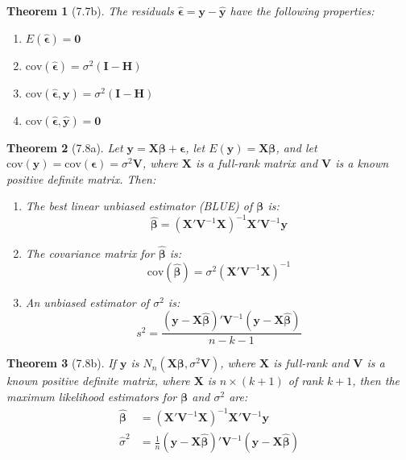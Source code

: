 \documentclass{article}
\newtheorem{theorem}{Theorem}[section]
\begin{document}
\begin{theorem}[7.7b]
The residuals $\hat{\boldsymbol{\epsilon}} = \mathbf{y} - \hat{\mathbf{y}}$ have the following properties:
\begin{enumerate}[label=(\roman*)]
\item $E(\hat{\boldsymbol{\epsilon}}) = \mathbf{0}$
\item $\text{cov}(\hat{\boldsymbol{\epsilon}}) = \sigma^2(\mathbf{I} - \mathbf{H})$
\item $\text{cov}(\hat{\boldsymbol{\epsilon}}, \mathbf{y}) = \sigma^2(\mathbf{I} - \mathbf{H})$
\item $\text{cov}(\hat{\boldsymbol{\epsilon}}, \hat{\mathbf{y}}) = \mathbf{0}$
\end{enumerate}
\end{theorem}

\begin{theorem}[7.8a]
Let $\mathbf{y} = \mathbf{X}\boldsymbol{\beta} + \boldsymbol{\epsilon}$, let $E(\mathbf{y}) = \mathbf{X}\boldsymbol{\beta}$, and let $\text{cov}(\mathbf{y}) = \text{cov}(\boldsymbol{\epsilon}) = \sigma^2\mathbf{V}$, where $\mathbf{X}$ is a full-rank matrix and $\mathbf{V}$ is a known positive definite matrix. Then:
\begin{enumerate}[label=(\roman*)]
\item The best linear unbiased estimator (BLUE) of $\boldsymbol{\beta}$ is:
\[\hat{\boldsymbol{\beta}} = (\mathbf{X}'\mathbf{V}^{-1}\mathbf{X})^{-1}\mathbf{X}'\mathbf{V}^{-1}\mathbf{y}\]
\item The covariance matrix for $\hat{\boldsymbol{\beta}}$ is:
\[\text{cov}(\hat{\boldsymbol{\beta}}) = \sigma^2(\mathbf{X}'\mathbf{V}^{-1}\mathbf{X})^{-1}\]
\item An unbiased estimator of $\sigma^2$ is:
\[s^2 = \frac{(\mathbf{y} - \mathbf{X}\hat{\boldsymbol{\beta}})'\mathbf{V}^{-1}(\mathbf{y} - \mathbf{X}\hat{\boldsymbol{\beta}})}{n-k-1}\]
\end{enumerate}
\end{theorem}

\begin{theorem}[7.8b]
If $\mathbf{y}$ is $N_n(\mathbf{X}\boldsymbol{\beta}, \sigma^2\mathbf{V})$, where $\mathbf{X}$ is full-rank and $\mathbf{V}$ is a known positive definite matrix, where $\mathbf{X}$ is $n \times (k+1)$ of rank $k+1$, then the maximum likelihood estimators for $\boldsymbol{\beta}$ and $\sigma^2$ are:
\begin{align*}
\hat{\boldsymbol{\beta}} &= (\mathbf{X}'\mathbf{V}^{-1}\mathbf{X})^{-1}\mathbf{X}'\mathbf{V}^{-1}\mathbf{y} \\
\hat{\sigma}^2 &= \frac{1}{n}(\mathbf{y} - \mathbf{X}\hat{\boldsymbol{\beta}})'\mathbf{V}^{-1}(\mathbf{y} - \mathbf{X}\hat{\boldsymbol{\beta}})
\end{align*}
\end{theorem}
\end{document}
